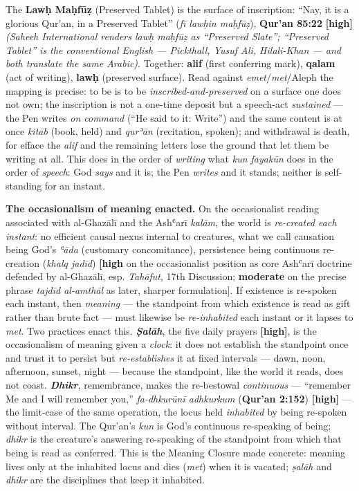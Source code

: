 \documentclass[11pt]{article}
\begin{document}
The \textbf{Lawḥ Maḥfūẓ} (Preserved Tablet) is the surface of inscription: ``Nay, it is a glorious Qur'an, in a Preserved Tablet'' (\emph{fī lawḥin maḥfūẓ}), \textbf{Qur'an 85:22} \textbf{[high]} \emph{(Saheeh International renders lawḥ maḥfūẓ as ``Preserved Slate''; ``Preserved Tablet'' is the conventional English — Pickthall, Yusuf Ali, Hilali-Khan — and both translate the same Arabic)}. Together: \textbf{alif} (first conferring mark), \textbf{qalam} (act of writing), \textbf{lawḥ} (preserved surface). Read against \emph{emet}/\allowbreak{}\emph{met}/\allowbreak{}Aleph the mapping is precise: to be is to be \emph{inscribed-and-preserved} on a surface one does not own; the inscription is not a one-time deposit but a speech-act \emph{sustained} — the Pen writes \emph{on command} (``He said to it: Write'') and the same content is at once \emph{kitāb} (book, held) and \emph{qurʾān} (recitation, spoken); and withdrawal is death, for efface the \emph{alif} and the remaining letters lose the ground that let them be writing at all. This does in the order of \emph{writing} what \emph{kun fayakūn} does in the order of \emph{speech}: God \emph{says} and it is; the Pen \emph{writes} and it stands; neither is self-standing for an instant.

\textbf{The occasionalism of meaning enacted.} On the occasionalist reading associated with al-Ghazālī and the Ashʿarī \emph{kalām}, the world is \emph{re-created each instant}: no efficient causal nexus internal to creatures, what we call causation being God's \emph{ʿāda} (customary concomitance), persistence being continuous re-creation (\emph{khalq jadīd}) \textbf{[high} on the occasionalist position as core Ashʿarī doctrine defended by al-Ghazālī, esp. \emph{Tahāfut}, 17th Discussion; \textbf{moderate} on the precise phrase \emph{tajdīd al-amthāl} as later, sharper formulation]. If existence is re-spoken each instant, then \emph{meaning} — the standpoint from which existence is read as gift rather than brute fact — must likewise be \emph{re-inhabited} each instant or it lapses to \emph{met}. Two practices enact this. \textbf{\emph{Ṣalāh}}, the five daily prayers \textbf{[high]}, is the occasionalism of meaning given a \emph{clock}: it does not establish the standpoint once and trust it to persist but \emph{re-establishes} it at fixed intervals — dawn, noon, afternoon, sunset, night — because the standpoint, like the world it reads, does not coast. \textbf{\emph{Dhikr}}, remembrance, makes the re-bestowal \emph{continuous} — ``remember Me and I will remember you,'' \emph{fa-dhkurūnī adhkurkum} (\textbf{Qur'an 2:152}) \textbf{[high]} — the limit-case of the same operation, the locus held \emph{inhabited} by being re-spoken without interval. The Qur'an's \emph{kun} is God's continuous re-speaking of being; \emph{dhikr} is the creature's answering re-speaking of the standpoint from which that being is read as conferred. This is the Meaning Closure made concrete: meaning lives only at the inhabited locus and dies (\emph{met}) when it is vacated; \emph{ṣalāh} and \emph{dhikr} are the disciplines that keep it inhabited.
\end{document}
